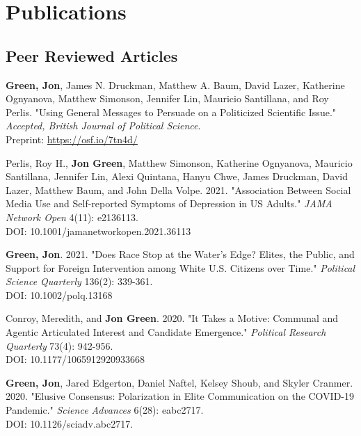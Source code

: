 \documentclass[letterpaper]{article}
\renewenvironment{itemize}{
  \begin{list}{}{
    \setlength{\leftmargin}{1.5em}
  }
}{
  \end{list}
}
\begin{document}
\section*{Publications}

\subsection*{Peer Reviewed Articles}

\begin{itemize}

\item  \textbf{Green, Jon}, James N. Druckman, Matthew A. Baum, David Lazer, Katherine Ognyanova, Matthew Simonson, Jennifer Lin, Mauricio Santillana, and Roy Perlis. "Using General Messages to Persuade on a Politicized Scientific Issue." \textit{Accepted, British Journal of Political Science}. \\
Preprint:  \url{https://osf.io/7tn4d/}

\item  Perlis, Roy H., \textbf{Jon Green}, Matthew Simonson, Katherine Ognyanova, Mauricio Santillana, Jennifer Lin, Alexi Quintana, Hanyu Chwe, James Druckman, David Lazer, Matthew Baum, and John Della Volpe. 2021. "Association Between Social Media Use and Self-reported Symptoms of Depression in US Adults." \textit{JAMA Network Open} 4(11): e2136113. \\
DOI: 10.1001/jamanetworkopen.2021.36113

\item \textbf{Green, Jon}. 2021. "Does Race Stop at the Water's Edge? Elites, the Public, and Support for Foreign Intervention among White U.S. Citizens over Time." \textit{Political Science Quarterly} 136(2): 339-361. \\
DOI: 10.1002/polq.13168

\item Conroy, Meredith, and \textbf{Jon Green}. 2020. "It Takes a Motive: Communal and Agentic Articulated Interest and Candidate Emergence."  \textit{Political Research Quarterly} 73(4): 942-956. \\
DOI: 10.1177/1065912920933668

\item \textbf{Green, Jon}, Jared Edgerton, Daniel Naftel, Kelsey Shoub, and Skyler Cranmer. 2020. "Elusive Consensus: Polarization in Elite Communication on the COVID-19 Pandemic." \textit{Science Advances} 6(28): eabc2717. \\
DOI: 10.1126/sciadv.abc2717.


\end{itemize}
\end{document}
